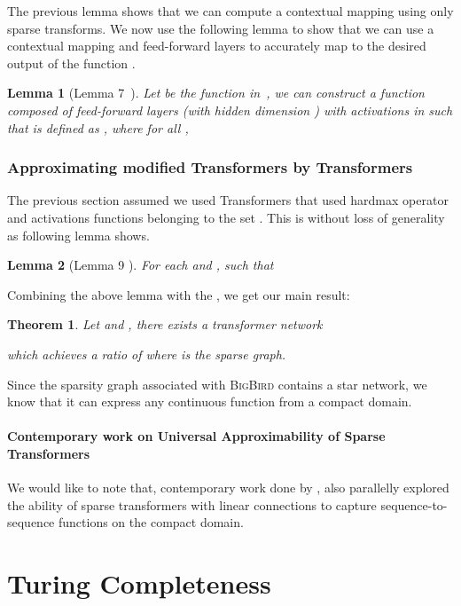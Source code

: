 \documentclass{article}
\newcommand{\bigb}{\textsc{BigBird}\xspace}
\newtheorem{theorem}{Theorem}
\newtheorem{lemma}{Lemma}
\begin{document}
The previous lemma shows that we can compute a contextual mapping using only sparse transforms. 
We now use the following lemma to show that we can use a contextual mapping and feed-forward layers
to accurately map to the desired output of the function . 

\begin{lemma}[Lemma 7~\cite{Yun19}]
Let  be the function in~, we can construct
a function  composed of 
 feed-forward layers (with hidden dimension ) 
with activations in  such that 
 is defined as  , 
where  for all , 
        
\end{lemma}

\subsubsection{Approximating modified Transformers by Transformers}

The previous section assumed we used Transformers that used hardmax operator  and 
activations functions belonging to the set . This is without loss of generality as
following lemma shows.

\begin{lemma}[Lemma 9 \cite{Yun19}]
For each  and ,  such that

\end{lemma}
    
Combining the above lemma with the , we get our main result:
\begin{theorem}
    Let  and , there exists a transformer network 
    
    which achieves a ratio of  where  is the sparse graph. 
\end{theorem}


Since the sparsity graph associated with \bigb contains a star network, we know that it 
can express any continuous function from a compact domain.


\paragraph{Contemporary work on Universal Approximability of Sparse Transformers}
We would like to note that, contemporary work done by \citet{yun2020on}, also parallelly explored the ability of sparse transformers with linear connections to capture sequence-to-sequence functions on the compact domain.
  
\newpage
\section{Turing Completeness}
\label{sec:apndx-turing}
\end{document}
